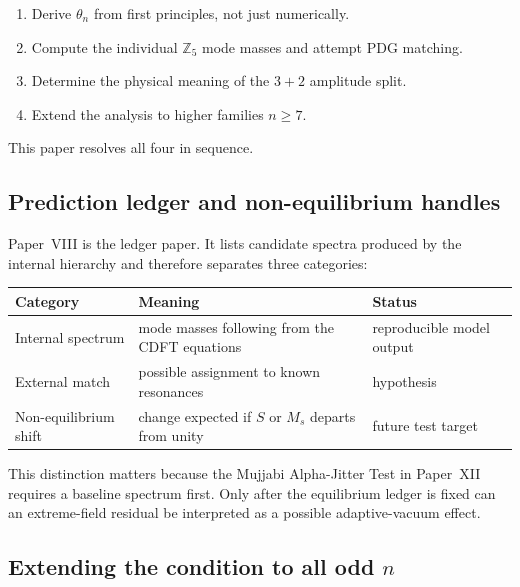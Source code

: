 \documentclass[11pt]{article}
\begin{document}
\begin{enumerate}[(1)]
  \item Derive $\theta_n$ from first principles, not just numerically.
  \item Compute the individual $\mathbb{Z}_5$ mode masses and attempt PDG matching.
  \item Determine the physical meaning of the $3+2$ amplitude split.
  \item Extend the analysis to higher families $n \geq 7$.
\end{enumerate}

This paper resolves all four in sequence.

\subsection{Prediction ledger and non-equilibrium handles}

Paper~VIII is the ledger paper. It lists candidate spectra produced by the
internal hierarchy and therefore separates three categories:
\begin{center}
\small
\begin{tabular}{p{}p{}p{}}
\toprule
\textbf{Category} & \textbf{Meaning} & \textbf{Status}\\
\midrule
Internal spectrum & mode masses following from the CDFT equations & reproducible model output\\
External match & possible assignment to known resonances & hypothesis\\
Non-equilibrium shift & change expected if $S$ or $M_s$ departs from unity & future test target\\
\bottomrule
\end{tabular}
\end{center}

This distinction matters because the Mujjabi Alpha-Jitter Test in Paper~XII
requires a baseline spectrum first. Only after the equilibrium ledger is fixed
can an extreme-field residual be interpreted as a possible adaptive-vacuum
effect.

\label{sec:sc_system}

\subsection{Extending the condition to all odd $n$}
\end{document}

